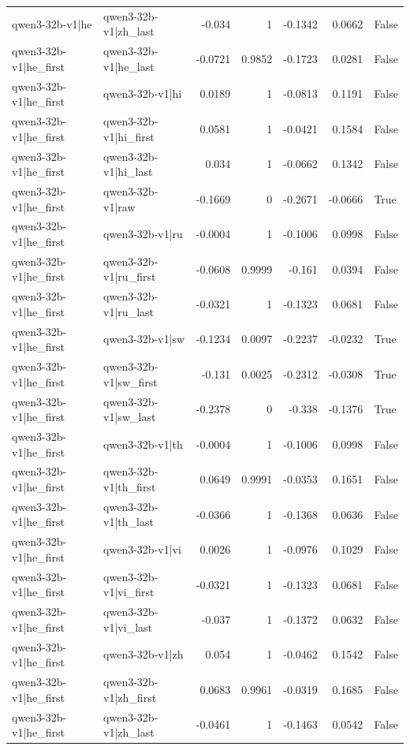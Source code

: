 \begin{table}
\begin{tabular}{l l r r r r l}
qwen3-32b-v1|he & qwen3-32b-v1|zh_last & -0.034 & 1 & -0.1342 & 0.0662 & False \\
qwen3-32b-v1|he_first & qwen3-32b-v1|he_last & -0.0721 & 0.9852 & -0.1723 & 0.0281 & False \\
qwen3-32b-v1|he_first & qwen3-32b-v1|hi & 0.0189 & 1 & -0.0813 & 0.1191 & False \\
qwen3-32b-v1|he_first & qwen3-32b-v1|hi_first & 0.0581 & 1 & -0.0421 & 0.1584 & False \\
qwen3-32b-v1|he_first & qwen3-32b-v1|hi_last & 0.034 & 1 & -0.0662 & 0.1342 & False \\
qwen3-32b-v1|he_first & qwen3-32b-v1|raw & -0.1669 & 0 & -0.2671 & -0.0666 & True \\
qwen3-32b-v1|he_first & qwen3-32b-v1|ru & -0.0004 & 1 & -0.1006 & 0.0998 & False \\
qwen3-32b-v1|he_first & qwen3-32b-v1|ru_first & -0.0608 & 0.9999 & -0.161 & 0.0394 & False \\
qwen3-32b-v1|he_first & qwen3-32b-v1|ru_last & -0.0321 & 1 & -0.1323 & 0.0681 & False \\
qwen3-32b-v1|he_first & qwen3-32b-v1|sw & -0.1234 & 0.0097 & -0.2237 & -0.0232 & True \\
qwen3-32b-v1|he_first & qwen3-32b-v1|sw_first & -0.131 & 0.0025 & -0.2312 & -0.0308 & True \\
qwen3-32b-v1|he_first & qwen3-32b-v1|sw_last & -0.2378 & 0 & -0.338 & -0.1376 & True \\
qwen3-32b-v1|he_first & qwen3-32b-v1|th & -0.0004 & 1 & -0.1006 & 0.0998 & False \\
qwen3-32b-v1|he_first & qwen3-32b-v1|th_first & 0.0649 & 0.9991 & -0.0353 & 0.1651 & False \\
qwen3-32b-v1|he_first & qwen3-32b-v1|th_last & -0.0366 & 1 & -0.1368 & 0.0636 & False \\
qwen3-32b-v1|he_first & qwen3-32b-v1|vi & 0.0026 & 1 & -0.0976 & 0.1029 & False \\
qwen3-32b-v1|he_first & qwen3-32b-v1|vi_first & -0.0321 & 1 & -0.1323 & 0.0681 & False \\
qwen3-32b-v1|he_first & qwen3-32b-v1|vi_last & -0.037 & 1 & -0.1372 & 0.0632 & False \\
qwen3-32b-v1|he_first & qwen3-32b-v1|zh & 0.054 & 1 & -0.0462 & 0.1542 & False \\
qwen3-32b-v1|he_first & qwen3-32b-v1|zh_first & 0.0683 & 0.9961 & -0.0319 & 0.1685 & False \\
qwen3-32b-v1|he_first & qwen3-32b-v1|zh_last & -0.0461 & 1 & -0.1463 & 0.0542 & False \\

\end{tabular}
\end{table}
